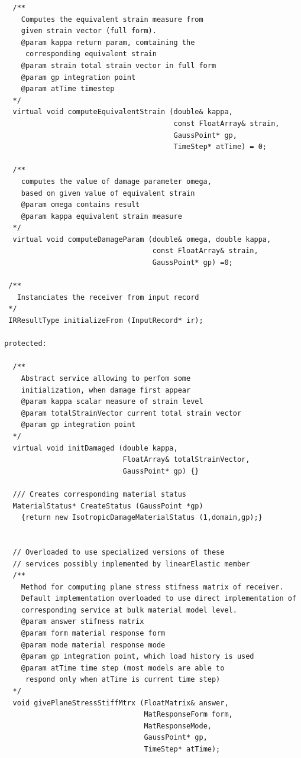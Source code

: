 \documentclass[a4paper]{article}
\begin{document}
{\begin{verbatim}
   /**
     Computes the equivalent strain measure from 
     given strain vector (full form).
     @param kappa return param, comtaining the 
      corresponding equivalent strain
     @param strain total strain vector in full form
     @param gp integration point
     @param atTime timestep
   */
   virtual void computeEquivalentStrain (double& kappa, 
                                         const FloatArray& strain, 
                                         GaussPoint* gp, 
                                         TimeStep* atTime) = 0;

   /**
     computes the value of damage parameter omega, 
     based on given value of equivalent strain
     @param omega contains result
     @param kappa equivalent strain measure
   */
   virtual void computeDamageParam (double& omega, double kappa, 
                                    const FloatArray& strain, 
                                    GaussPoint* gp) =0;

  /**
    Instanciates the receiver from input record
  */
  IRResultType initializeFrom (InputRecord* ir);

 protected: 

   /** 
     Abstract service allowing to perfom some 
     initialization, when damage first appear
     @param kappa scalar measure of strain level
     @param totalStrainVector current total strain vector
     @param gp integration point
   */
   virtual void initDamaged (double kappa, 
                             FloatArray& totalStrainVector, 
                             GaussPoint* gp) {}

   /// Creates corresponding material status 
   MaterialStatus* CreateStatus (GaussPoint *gp) 
     {return new IsotropicDamageMaterialStatus (1,domain,gp);}


   // Overloaded to use specialized versions of these 
   // services possibly implemented by linearElastic member
   /**
     Method for computing plane stress stifness matrix of receiver.
     Default implementation overloaded to use direct implementation of 
     corresponding service at bulk material model level.
     @param answer stifness matrix
     @param form material response form
     @param mode material response mode
     @param gp integration point, which load history is used
     @param atTime time step (most models are able to 
      respond only when atTime is current time step)
   */
   void givePlaneStressStiffMtrx (FloatMatrix& answer, 
                                  MatResponseForm form,
                                  MatResponseMode,
                                  GaussPoint* gp,
                                  TimeStep* atTime);



\end{verbatim}}
\end{document}

